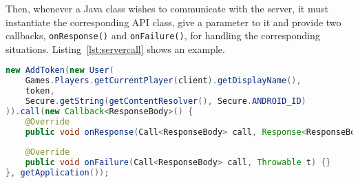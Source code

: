 Then, whenever a Java class wishes to communicate with the server, it must 
instantiate the corresponding API class, give a parameter to it and provide
two callbacks, \texttt{onResponse()} and \texttt{onFailure()}, for handling the
corresponding situations. Listing~\ref{lst:servercall} shows an example.

\begin{lstlisting}[language=Java, caption={Server call example}, label={lst:servercall}]
new AddToken(new User(
	Games.Players.getCurrentPlayer(client).getDisplayName(),
	token,
	Secure.getString(getContentResolver(), Secure.ANDROID_ID)
)).call(new Callback<ResponseBody>() {
	@Override
	public void onResponse(Call<ResponseBody> call, Response<ResponseBody> response) {}
	
	@Override
	public void onFailure(Call<ResponseBody> call, Throwable t) {}
}, getApplication());
\end{lstlisting}